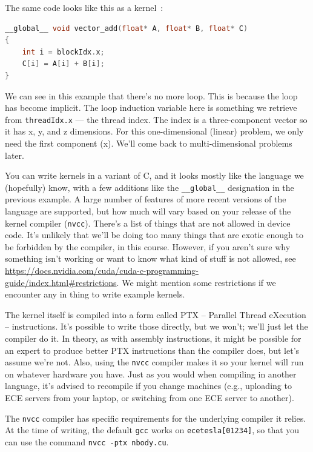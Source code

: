 \documentclass[a4paper]{report}
\newcommand{\CPP}{C\nolinebreak\hspace{-.05em}\raisebox{.4ex}{\tiny\bf +}\nolinebreak\hspace{-.10em}\raisebox{.4ex}{\tiny\bf +}}
\def\CPP{{C\nolinebreak[4]\hspace{-.05em}\raisebox{.4ex}{\tiny\bf ++}}}
\begin{document}
The same code looks like this as a kernel~\cite{cuda}:
\begin{lstlisting}[language=C++]
__global__ void vector_add(float* A, float* B, float* C)
{
    int i = blockIdx.x;
    C[i] = A[i] + B[i];
}
\end{lstlisting}

We can see in this example that there's no more loop. This is because the loop has become implicit. The loop induction variable here is something we retrieve from \texttt{threadIdx.x} --- the thread index. The index is a three-component vector so it has x, y, and z dimensions. For this one-dimensional (linear) problem, we only need the first component (x). We'll come back to multi-dimensional problems later.

You can write kernels in a variant of \CPP, and it looks mostly like the language we (hopefully) know, with a few additions like the \texttt{\_\_global\_\_} designation in the previous example. A large number of features of more recent versions of the language are supported, but how much will vary based on your release of the kernel compiler (\texttt{nvcc}). There's a list of things that are not allowed in device code. It's unlikely that we'll be doing too many things that are exotic enough to be forbidden by the compiler, in this course. However, if you aren't sure why something isn't working or want to know what kind of stuff is not allowed, see \url{https://docs.nvidia.com/cuda/cuda-c-programming-guide/index.html#restrictions}. We might mention some restrictions if we encounter any in thing to write example kernels.

The kernel itself is compiled into a form called PTX -- Parallel Thread eXecution -- instructions. It's possible to write those directly, but we won't; we'll just let the compiler do it. In theory, as with assembly instructions, it might be possible for an expert to produce better PTX instructions than the compiler does, but let's assume we're not. Also, using the \texttt{nvcc} compiler makes it so your kernel will run on whatever hardware you have. Just as you would when compiling in another language, it's advised to recompile if you change machines (e.g., uploading to ECE servers from your laptop, or switching from one ECE server to another).

The \texttt{nvcc} compiler has specific requirements for the underlying compiler it relies. At the time of writing, the default \texttt{gcc} works on \texttt{ecetesla[01234]}, so that you can use the command \texttt{nvcc -ptx nbody.cu}.
\end{document}
